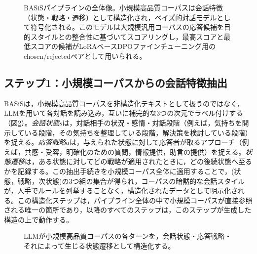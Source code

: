 \documentclass[manuscript,review,anonymous]{acmart}
\begin{document}
\begin{figure}[t]
  \centering
  \caption{BASiSパイプラインの全体像。小規模高品質コーパスは会話特徴（状態・戦略・遷移）として構造化され，ベイズ的対話モデルとして符号化される。このモデルは大規模汎用コーパスの応答候補を目的スタイルとの整合性に基づいてスコアリングし，最高スコアと最低スコアの候補がLoRAベースDPOファインチューニング用のchosen/rejectedペアとして用いられる。}
  \label{fig:pipeline}
\end{figure}

\subsection{ステップ1：小規模コーパスからの会話特徴抽出}
BASiSは，小規模高品質コーパスを非構造化テキストとして扱うのではなく，LLMを用いて各対話を読み込み，互いに補完的な3つの次元でラベル付けする（図\ref{fig:features}）。\emph{会話状態}$s$は，対話相手の状況・感情・対話段階（例えば，気持ちを開示している段階，その気持ちを整理している段階，解決策を検討している段階）を捉える。\emph{応答戦略}$a$は，与えられた状態に対して応答者が取るアプローチ（例えば，共感・受容，明確化のための質問，情報提供，助言の提供）を捉える。\emph{状態遷移}は，ある状態に対してどの戦略が適用されたときに，どの後続状態へ至るかを記録する。この抽出手続きを小規模コーパス全体に適用することで，(状態，戦略，次状態)の3つ組の集合が得られ，コーパスの暗黙的な会話スタイルが，人手でルールを列挙することなく，構造化されたデータとして明示化される。この構造化ステップは，パイプライン全体の中で小規模コーパスが直接参照される唯一の箇所であり，以降のすべてのステップは，このステップが生成した構造の上で動作する。

\begin{figure}[t]
  \centering
  \caption{LLMが小規模高品質コーパスの各ターンを，会話状態・応答戦略・それによって生じる状態遷移として構造化する。}
  \label{fig:features}
\end{figure}
\end{document}
